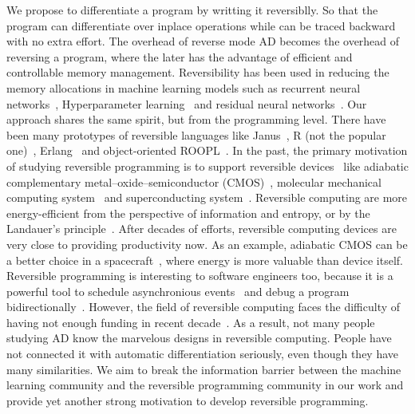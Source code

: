 \documentclass{article}
\newcommand{\<}{\langle}
\renewcommand{\>}{\rangle}
\theoremstyle{definition}\newtheorem{definition}{\textit{Definition}}
\begin{document}
    We propose to differentiate a program by writting it reversiblly. So that the program can differentiate over inplace operations while can be traced backward with no extra effort. The overhead of reverse mode AD becomes the overhead of reversing a program, where the later has the advantage of efficient and controllable memory management. Reversibility has been used in reducing the memory allocations in machine learning models such as recurrent neural networks~\cite{MacKay2018}, Hyperparameter learning~\cite{Maclaurin2015} and residual neural networks~\cite{Behrmann2018}. Our approach shares the same spirit, but from the programming level.
There have been many prototypes of reversible languages like Janus~\cite{Lutz1986}, R (not the popular one)~\cite{Frank1997}, Erlang~\cite{Lanese2018} and object-oriented ROOPL~\cite{Haulund2017}. %
    In the past, the primary motivation of studying reversible programming is to support reversible devices~\cite{Frank1999} like adiabatic complementary metal–oxide–semiconductor (CMOS)~\cite{Koller1992}, molecular mechanical computing system~\cite{Merkle2018} and superconducting system~\cite{Likharev1977,Semenov2003}.
    Reversible computing are more energy-efficient from the perspective of information and entropy, or by the Landauer's principle~\cite{Landauer1961}.
    After decades of efforts, reversible computing devices are very close to providing productivity now. As an example, adiabatic CMOS can be a better choice in a spacecraft~\cite{Hanninen2014, Debenedictis2017}, where energy is more valuable than device itself.
    Reversible programming is interesting to software engineers too, because it is a powerful tool to schedule asynchronious events~\cite{Jefferson1985} and debug a program bidirectionally~\cite{Boothe2000}.
    However, the field of reversible computing faces the difficulty of having not enough funding in recent decade~\cite{Frank2017}. As a result, not many people studying AD know the marvelous designs in reversible computing. People have not connected it with automatic differentiation seriously, even though they have many similarities. We aim to break the information barrier between the machine learning community and the reversible programming community in our work and provide yet another strong motivation to develop reversible programming.
\end{document}
